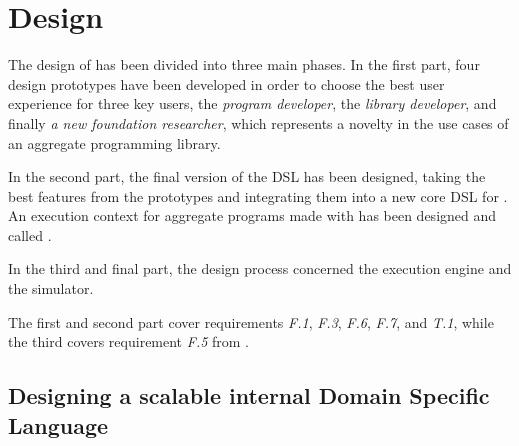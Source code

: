 \chapter{Design}
\label{chap:design}
The design of \this has been divided into three main phases.
%
In the first part, four design prototypes have been developed in order to choose the best user experience for three key users, the \textit{program developer}, the \textit{library developer}, and finally \textit{a new foundation researcher}, which represents a novelty in the use cases of an aggregate programming library.

In the second part, the final version of the \ac{DSL} has been designed, taking the best features from the prototypes and integrating them into a new core \ac{DSL} for \this.
%
An execution context for aggregate programs made with \this has been designed and called .

In the third and final part, the design process concerned the execution engine and the simulator.

The first and second part cover requirements \textit{F.1}, \textit{F.3}, \textit{F.6}, \textit{F.7}, and \textit{T.1}, while the third covers requirement \textit{F.5} from .

\section{Designing a scalable internal Domain Specific Language} \label{chap:design->sec:dsl}


